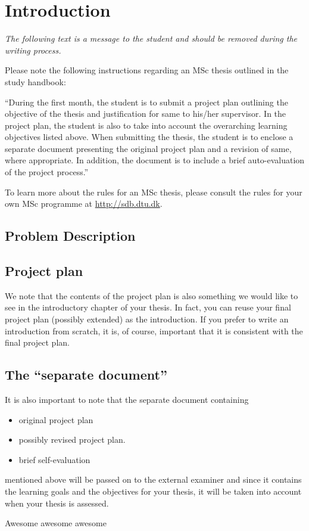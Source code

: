 \chapter{Introduction}



\textit{The following text is a message to the student and should be removed during the writing process.}

Please note the following instructions regarding an MSc thesis outlined in the study handbook: 

``During the first month, the student is to submit a project plan outlining the objective of the thesis and justification for same to his/her supervisor. In the project plan, the student is also to take into account the overarching learning objectives listed above. When submitting the thesis, the student is to enclose a separate document presenting the original project plan and a revision of same, where appropriate. In addition, the document is to include a brief auto-evaluation of the project process.''

To learn more about the rules for an MSc thesis, please consult the rules for your own MSc programme at \url{http://sdb.dtu.dk}.

\section{Problem Description}




\section{Project plan}
We note that the contents of the project plan is also something we would like to see in the introductory chapter of your thesis. In fact, you can reuse your final project plan (possibly extended) as the introduction. If you prefer to write an introduction from scratch, it is, of course, important that it is consistent with the final project plan.



\section{The ``separate document''}
It is also important to note that the separate document containing
\begin{itemize}
\item original project plan
\item possibly revised project plan. 
\item brief self-evaluation
\end{itemize}

mentioned above will be passed on to the external examiner and since it contains the learning goals and the objectives for your thesis, it will be taken into account when your thesis is assessed. 

Awesome awesome awesome

